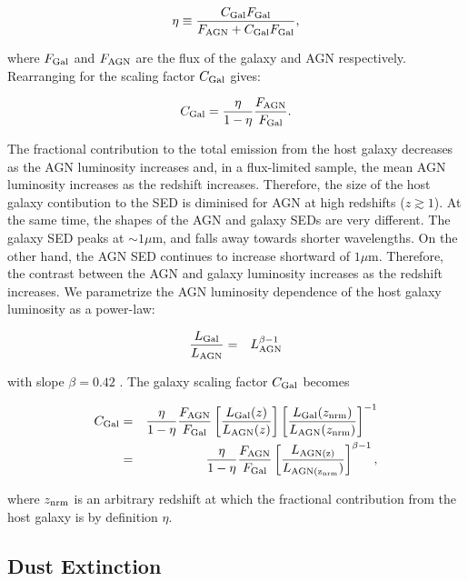 \begin{eqnarray}
  \eta \equiv \frac{C_{\rm Gal}F_{\rm Gal}}{F_{\rm AGN} + C_{\rm Gal}F_{\rm Gal}},
\end{eqnarray}

where $F_{\rm Gal}$ and $F_{\rm AGN}$ are the flux of the galaxy and \ac{AGN} respectively. 
Rearranging for the scaling factor $C_{\rm Gal}$ gives:

\begin{eqnarray}
  C_{\rm Gal} = \frac{\eta}{1 - \eta} \frac{F_{\rm AGN}}{F_{\rm Gal}}.
\end{eqnarray}

The fractional contribution to the total emission from the host galaxy decreases as the \ac{AGN} luminosity increases and, in a flux-limited sample, the mean \ac{AGN} luminosity increases as the redshift increases.
Therefore, the size of the host galaxy contibution to the \ac{SED} is diminised for \ac{AGN} at high redshifts ($z\gtrsim1$). 
At the same time, the shapes of the \ac{AGN} and galaxy \ac{SED}s are very different. 
The galaxy \ac{SED} peaks at $\sim1\mu$m, and falls away towards shorter wavelengths. 
On the other hand, the \ac{AGN} \ac{SED} continues to increase shortward of $1\mu$m. 
Therefore, the contrast between the \ac{AGN} and galaxy luminosity increases as the redshift increases. 
We parametrize the \ac{AGN} luminosity dependence of the host galaxy luminosity as a power-law:

\begin{eqnarray}
  \label{eq:lgal}
  \frac{L_{\rm Gal}}{L_{\rm AGN}} &=& L_{\rm AGN}^{\beta - 1} 
\end{eqnarray}

with slope $\beta=0.42$ \citep{croom04}. 
The galaxy scaling factor $C_{\rm Gal}$ becomes 

\begin{eqnarray}
  C_{\rm Gal} &=& \frac{\eta}{1 - \eta} \frac{F_{\rm AGN}}{F_{\rm Gal}} \left[ \frac{ L_{\rm Gal}(z)} {L_{\rm AGN}(z)} \right] \left[ \frac{ L_{\rm Gal}(z_{\rm nrm})} {L_{\rm AGN}(z_{\rm nrm})} \right]^{-1} \\
  &=& \frac{\eta}{1 - \eta} \frac{F_{\rm AGN}}{F_{\rm Gal}} \left[ \frac{L_{\rm AGN(z)}} {L_{\rm AGN(z_{\rm nrm}})} \right]^{\beta -1}, 
\end{eqnarray}

where $z_{\rm nrm}$ is an arbitrary redshift at which the fractional contribution from the host galaxy is by definition $\eta$. 

\subsection{Dust Extinction}
\label{sec:sed-extinction} 

